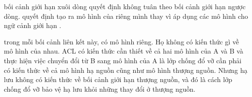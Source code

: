 bối cảnh giới hạn xuôi dòng quyết định không tuân theo bối cảnh giới hạn ngược dòng.
quyết định tạo ra mô hình của riêng mình thay vì áp dụng các mô hình cho ngữ cảnh giới hạn .




trong mỗi bối cảnh liên kết này, có mô hình riêng. Họ không có kiến thức gì về mô hình của nhau.
ACL có kiến thức cần thiết về cả hai mô hình của A và B và thực hiện việc chuyển đổi từ B sang mô hình của A là lớp chống đổ vỡ cần phải có kiến thức về cả mô hình hạ nguồn cũng như mô hình thượng nguồn.
Nhưng hạ lưu không có kiến thức về bối cảnh giới hạn thượng nguồn, và đó là cách lớp chống đổ vỡ bảo vệ hạ lưu khỏi những thay đổi ở thượng nguồn.









